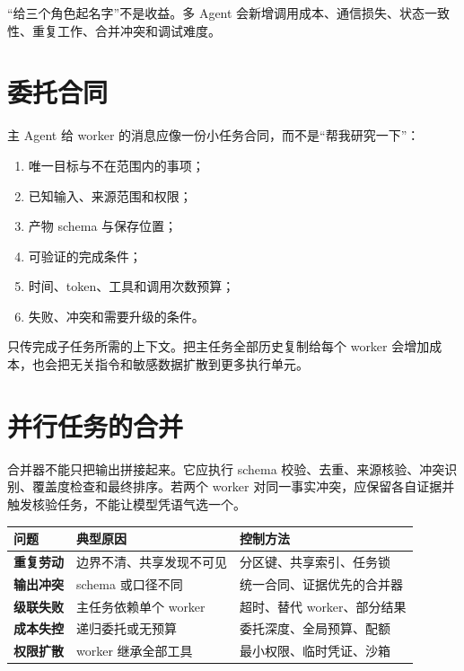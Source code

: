 “给三个角色起名字”不是收益。多 Agent 会新增调用成本、通信损失、状态一致性、重复工作、合并冲突和调试难度。

\section{委托合同}

主 Agent 给 worker 的消息应像一份小任务合同，而不是“帮我研究一下”：

\begin{enumerate}
  \item 唯一目标与不在范围内的事项；
  \item 已知输入、来源范围和权限；
  \item 产物 schema 与保存位置；
  \item 可验证的完成条件；
  \item 时间、token、工具和调用次数预算；
  \item 失败、冲突和需要升级的条件。
\end{enumerate}

只传完成子任务所需的上下文。把主任务全部历史复制给每个 worker 会增加成本，也会把无关指令和敏感数据扩散到更多执行单元。

\section{并行任务的合并}

合并器不能只把输出拼接起来。它应执行 schema 校验、去重、来源核验、冲突识别、覆盖度检查和最终排序。若两个 worker 对同一事实冲突，应保留各自证据并触发核验任务，不能让模型凭语气选一个。

\begin{table}[htbp]
\centering
\begin{tabularx}{\textwidth}{>{\bfseries}p{} X X}
\toprule
问题 & 典型原因 & 控制方法 \\
\midrule
重复劳动 & 边界不清、共享发现不可见 & 分区键、共享索引、任务锁 \\
输出冲突 & schema 或口径不同 & 统一合同、证据优先的合并器 \\
级联失败 & 主任务依赖单个 worker & 超时、替代 worker、部分结果 \\
成本失控 & 递归委托或无预算 & 委托深度、全局预算、配额 \\
权限扩散 & worker 继承全部工具 & 最小权限、临时凭证、沙箱 \\
\bottomrule
\end{tabularx}
\end{table}

